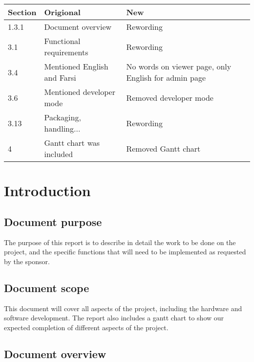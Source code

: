 \documentclass[onecolumn, draftclsnofoot,10pt, compsoc]{IEEEtran}
\begin{document}
\begin{center}
 \begin{tabular}{||p{1cm} p{7cm} p{7cm}||} 
 \hline
 Section & Origional & New\\ [0.5ex] 
 \hline\hline
 1.3.1 & Document overview & Rewording\\
 \hline
 3.1 & Functional requirements & Rewording \\ 
 \hline
 3.4 & Mentioned English and Farsi & No words on viewer page, only English for admin page \\ 
 \hline
 3.6 & Mentioned developer mode & Removed developer mode \\ 
 \hline
  3.13 & Packaging, handling... & Rewording \\ 
 \hline
 4 & Gantt chart was included & Removed Gantt chart \\[1ex] 
 \hline
\end{tabular}
\end{center}

\section{Introduction}
    \subsection{Document purpose}
    The purpose of this report is to describe in detail the work to be done on the project, and the specific functions that will need to be implemented as requested by the sponsor.

    \subsection{Document scope}
    This document will cover all aspects of the project, including the hardware and software development.
    The report also includes a gantt chart to show our expected completion of different aspects of the project.
    
    \subsection{Document overview}
\end{document}
